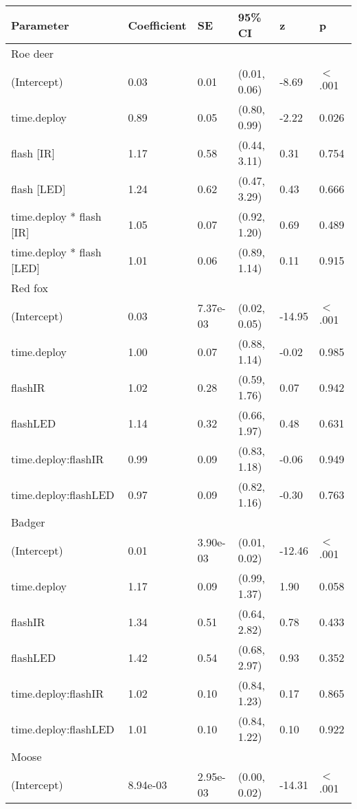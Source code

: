 \begin{table}[ht]
\centering
\begin{tabular}{llllll}
  \hline
Parameter & Coefficient & SE & 95\% CI & z & p \\ 
  \hline
Roe deer &  &  &  &  &        \\ 
  (Intercept) & 0.03 & 0.01 & (0.01, 0.06) & -8.69 & $<$ .001 \\ 
  time.deploy & 0.89 & 0.05 & (0.80, 0.99) & -2.22 & 0.026  \\ 
  flash [IR] & 1.17 & 0.58 & (0.44, 3.11) & 0.31 & 0.754  \\ 
  flash [LED] & 1.24 & 0.62 & (0.47, 3.29) & 0.43 & 0.666  \\ 
  time.deploy * flash [IR] & 1.05 & 0.07 & (0.92, 1.20) & 0.69 & 0.489  \\ 
  time.deploy * flash [LED] & 1.01 & 0.06 & (0.89, 1.14) & 0.11 & 0.915  \\ 
  Red fox &  &  &  &  &        \\ 
  (Intercept) & 0.03 & 7.37e-03 & (0.02, 0.05) & -14.95 & $<$ .001 \\ 
  time.deploy & 1.00 & 0.07 & (0.88, 1.14) & -0.02 & 0.985  \\ 
  flashIR & 1.02 & 0.28 & (0.59, 1.76) & 0.07 & 0.942  \\ 
  flashLED & 1.14 & 0.32 & (0.66, 1.97) & 0.48 & 0.631  \\ 
  time.deploy:flashIR & 0.99 & 0.09 & (0.83, 1.18) & -0.06 & 0.949  \\ 
  time.deploy:flashLED & 0.97 & 0.09 & (0.82, 1.16) & -0.30 & 0.763  \\ 
  Badger &  &  &  &  &        \\ 
  (Intercept) & 0.01 & 3.90e-03 & (0.01, 0.02) & -12.46 & $<$ .001 \\ 
  time.deploy & 1.17 & 0.09 & (0.99, 1.37) & 1.90 & 0.058  \\ 
  flashIR & 1.34 & 0.51 & (0.64, 2.82) & 0.78 & 0.433  \\ 
  flashLED & 1.42 & 0.54 & (0.68, 2.97) & 0.93 & 0.352  \\ 
  time.deploy:flashIR & 1.02 & 0.10 & (0.84, 1.23) & 0.17 & 0.865  \\ 
  time.deploy:flashLED & 1.01 & 0.10 & (0.84, 1.22) & 0.10 & 0.922  \\ 
  Moose &  &  &  &  &        \\ 
  (Intercept) & 8.94e-03 & 2.95e-03 & (0.00, 0.02) & -14.31 & $<$ .001 \\ 

\end{tabular}
\end{table}

